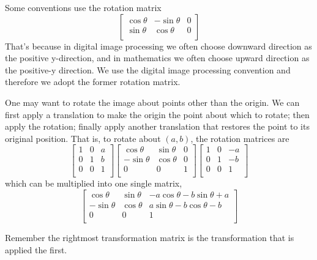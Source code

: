 \documentclass{note}
\begin{document}
\begin{important}
    Some conventions use the rotation matrix
    \begin{equation*}
        \begin{bmatrix}
            \cos \theta & -\sin \theta & 0 \\
            \sin \theta &  \cos \theta & 0 \\
        \end{bmatrix}
    \end{equation*} 
    That's because in digital image processing we often choose downward direction as the positive y-direction, and in mathematics we often choose upward direction as the positive-y direction. We use the digital image processing convention and therefore we adopt the former rotation matrix.
\end{important}

One may want to rotate the image about points other than the origin. We can first apply a translation to make the origin the point about which to rotate; then apply the rotation; finally apply another translation that restores the point to its original position. That is, to rotate about $(a, b)$, the rotation matrices are
\begin{equation*}
    \begin{bmatrix}
        1 & 0 & a \\
        0 & 1 & b \\
        0 & 0 & 1 \\
    \end{bmatrix}
    \begin{bmatrix}
         \cos \theta & \sin \theta & 0 \\
        -\sin \theta & \cos \theta & 0 \\
         0           & 0           & 1 \\
    \end{bmatrix}
    \begin{bmatrix}
        1 & 0 & -a \\
        0 & 1 & -b \\
        0 & 0 & 1 \\
    \end{bmatrix}
\end{equation*}
which can be multiplied into one single matrix, 
\begin{equation*}
    \begin{bmatrix}
         \cos \theta &  \sin \theta & -a \cos \theta - b \sin \theta + a \\
        -\sin \theta &  \cos \theta &  a \sin \theta - b \cos \theta - b \\
        0           &  0           & 1 \\
    \end{bmatrix}
\end{equation*}
\begin{tip}
    Remember the rightmost transformation matrix is the transformation that is applied the first.
\end{tip}
\end{document}
